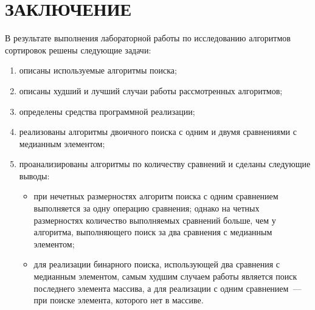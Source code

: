\chapter*{ЗАКЛЮЧЕНИЕ}

В результате выполнения лабораторной работы по исследованию алгоритмов сортировок решены следующие задачи:
\begin{enumerate}
    \item описаны используемые алгоритмы поиска;
	\item описаны худший и лучший случаи работы рассмотренных алгоритмов;
	\item определены средства программной реализации;
	\item реализованы алгоритмы двоичного поиска с одним и двумя сравнениями с медианным элементом;
	\item проанализированы алгоритмы по количеству сравнений и сделаны следующие выводы:
	\begin{itemize}
		\item при нечетных размерностях алгоритм поиска с одним сравнением выполняется за одну операцию сравнения; однако на четных размерностях количество выполняемых сравнений больше, чем у алгоритма, выполняющего поиск за два сравнения с медианным элементом;
		\item для реализации бинарного поиска, использующей два сравнения с медианным элементом, самым худшим случаем работы является поиск последнего элемента массива, а для реализации с одним сравнением~--- при поиске элемента, которого нет в массиве.
	\end{itemize}
\end{enumerate}